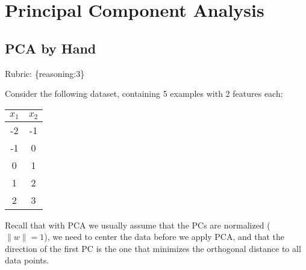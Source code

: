 \documentclass{article}
\def\rubric#1{\gre{Rubric: \{#1\}}}{}
\def\gre#1{{\color{gre}#1}}
\def\norm#1{\|#1\|}
\begin{document}
\section{Principal Component Analysis}

\subsection{PCA by Hand}
\rubric{reasoning:3}


Consider the following dataset, containing 5 examples with 2 features each:
\begin{center}
\begin{tabular}{cc}
$x_1$ & $x_2$\\
\hline
-2 & -1\\
-1 & 0\\
0 & 1\\
1 & 2\\
2 & 3\\
\end{tabular}
\end{center}
Recall that with PCA we usually assume that the PCs are normalized ($\norm{w} = 1$), we need to center the data before we apply PCA, and that the direction of the first PC is the one that minimizes the orthogonal distance to all data points.
\end{document}
